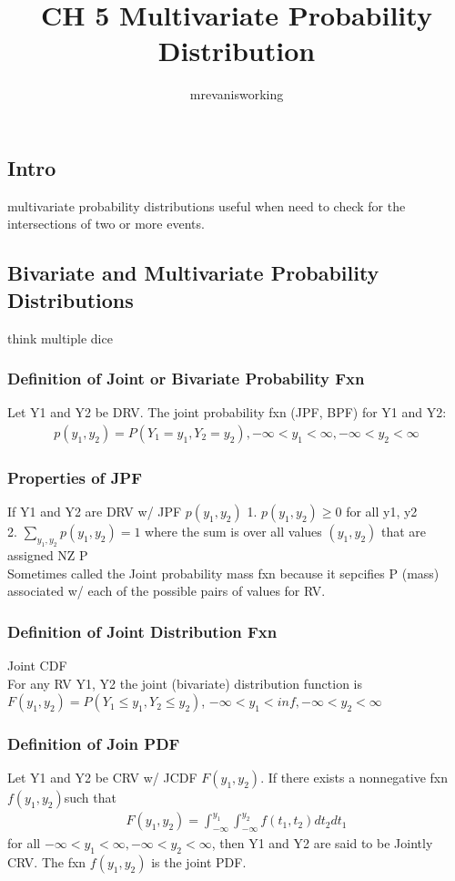 \documentclass[12pt]{article}
\begin{document}
\title{CH 5 Multivariate Probability Distribution}
\author{mrevanisworking}
\maketitle

\subsection{Intro}
    multivariate probability distributions useful when need to 
    check for the intersections of two or more events.
\subsection{Bivariate and Multivariate Probability Distributions}
    think multiple dice
    \subsubsection{Definition of Joint or Bivariate Probability Fxn}
        Let Y1 and Y2 be DRV. The joint probability fxn (JPF, BPF) for
        Y1 and Y2:
        \begin{align*}
            p(y_{1}, y_{2}) = P(Y_{1} = y_{1},  Y_2 = y_2),
            -\infty < y_1 < \infty ,-\infty < y_2 <\infty
        \end{align*}
    \subsubsection{Properties of JPF}
        If Y1 and Y2 are DRV w/ JPF $ p(y_1, y_2) $
        1. $ p(y_1, y_2) \ge 0 $ for all y1, y2\\
        2. $ \sum_{y_1, y_2}p(y_1, y_2) = 1 $ where the sum is over all values
        $ (y_1, y_2) $ that are assigned NZ P\\
        Sometimes called the Joint probability mass fxn because it 
        sepcifies P (mass) associated w/ each of the possible pairs of values
        for RV. 
    \subsubsection{Definition of Joint Distribution Fxn}
        Joint CDF\\
        For any RV Y1, Y2 the joint (bivariate) distribution function is
        $ F(y_1, y_2) = P(Y_1 \le y_1, Y_2 \le y_2) $,
        $ -\infty < y_1 < inf, -\infty < y_2 < \infty  $
    \subsubsection{Definition of Join PDF}
        Let Y1 and Y2 be CRV w/ JCDF $ F(y_1, y_2) $. If there exists a
        nonnegative fxn $ f(y_1, y_2) $such that
        \begin{align*}
            F(y_1, y_2) = \int_{-\infty }^{y_1}\int_{-\infty }^{y_2}
            f(t_1, t_2)dt_2dt_{1}
        \end{align*}
        for all $ -\infty < y_{1} < \infty , -\infty < y_{2} < \infty  $,
            then Y1 and Y2 are said to be Jointly CRV. The fxn $ f(y_1, y_2) $
            is the joint PDF.
\end{document}
